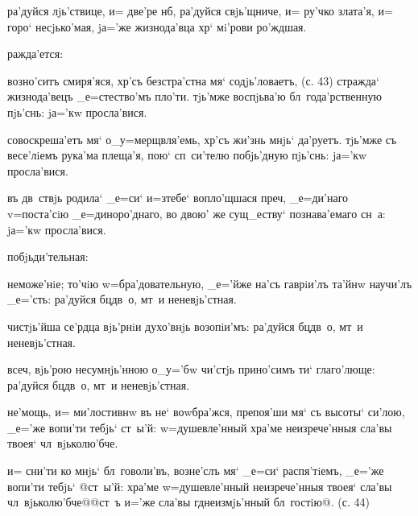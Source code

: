 ра'дуйся лjь'ствице, и= две'ре нб, ра'дуйся 
свjь'щниче, и= ру'чко злата'я, и= горо` несjько'мая, 
jа='же жизнода'вца хр` мi'рови ро'ждшая.


ражда'ется:

возно'ситъ смиря'яся, хр'съ безстра'стна мя` 
содjь'ловаетъ, (с. 43) стражда` жизнода'вецъ 
_е=стество'мъ пло'ти. тjь'мже воспjьва'ю 
бл~года'рственную пjь'снь: jа='кw просла'вися.

совоскреша'етъ мя` о_у=мерщвля'емь, хр'съ жи'знь 
мнjь` да'руетъ. тjь'мже съ весе'лiемъ рука'ма плеща'я, 
пою` сп~си'телю побjь'дную пjь'снь: jа='кw просла'вися.

въ дв~ствjь родила` _е=си` и=з\ъ тебе` вопло'щшася 
преч, _е=ди'наго v=поста'сiю _е=диноро'днаго, во 
двою' же сущ_еству` познава'емаго сн~а: jа='кw 
просла'вися.


побjьди'тельная:

неможе'нiе; то'чiю w=бра'довательную, _е='йже на'съ 
гаврiи'лъ та'йнw научи'лъ _е='сть: ра'дуйся бц дв~о, 
мт~и неневjь'стная.

чистjь'йша се'рдца вjь'рнiи духо'внjь возопiи'мъ: 
ра'дуйся бц дв~о, мт~и неневjь'стная.

всеч, вjь'рою несумнjь'нною о_у='бw чи'стjь 
прино'симъ ти` глаго'люще: ра'дуйся бц дв~о, мт~и 
неневjь'стная.



не'мощь, и= ми'лостивнw въ не` воwбра'жся, препоя'ши мя` 
съ высоты` си'лою, _е='же вопи'ти тебjь` ст~ы'й: 
w=душевле'нный хра'ме неизрече'нныя сла'вы твоея` 
чл~вjьколю'бче.

и= сни'ти ко мнjь` бл~говоли'въ, возне'слъ мя` _е=си` 
распя'тiемъ, _е='же вопи'ти тебjь` @ст~ы'й: хра'ме 
w=душевле'нный неизрече'нныя твоея` сла'вы 
чл~вjьколю'бче@{@ст~ъ и='же сла'вы гд неизмjь'нный 
бл~гостiю@}. (с. 44)


